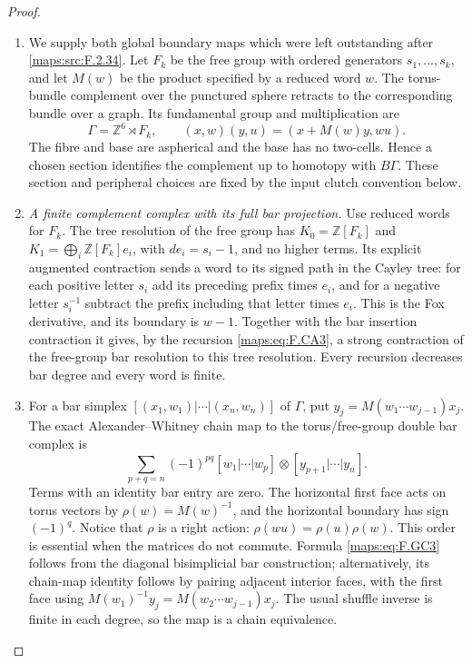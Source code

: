 \begin{proof}
\begin{enumerate}[label=\arabic*.]
\item We supply both global boundary maps which were left outstanding
after \ref{maps:src:F.2.34}.  Let $F_k$ be the free group with ordered
generators $s_1,\ldots,s_k$, and let $M(w)$ be the product
specified by a reduced word $w$.  The torus-bundle complement
over the punctured sphere retracts to the corresponding bundle
over a graph.  Its fundamental group and multiplication are
\[
 \Gamma=\mathbb Z^6\rtimes F_k,
 \qquad (x,w)(y,u)=(x+M(w)y,wu).                            \tag{F.GC2}\label{maps:eq:F.GC2}
\]
The fibre and base are aspherical and the base has no
two-cells.  Hence a chosen section identifies the complement
up to homotopy with $B\Gamma$.  These section and peripheral
choices are fixed by the input clutch convention below.

\item \emph{A finite complement complex with its full bar projection.}
Use reduced words for $F_k$.  The tree resolution of the free
group has $K_0=\mathbb Z[F_k]$ and
$K_1=\bigoplus_i\mathbb Z[F_k]e_i$, with
$de_i=s_i-1$, and no higher terms.  Its explicit augmented
contraction sends a word to its signed path in the Cayley
tree: for each positive letter $s_i$ add its preceding prefix
times $e_i$, and for a negative letter $s_i^{-1}$ subtract
the prefix including that letter times $e_i$.
This is the Fox derivative, and its boundary is $w-1$.
Together with the bar insertion contraction it gives, by
the recursion \eqref{maps:eq:F.CA3}, a strong contraction of the free-group
bar resolution to this tree resolution.  Every recursion
decreases bar degree and every word is finite.

\item For a bar simplex $[(x_1,w_1)|\cdots|(x_n,w_n)]$ of $\Gamma$,
put $y_j=M(w_1\cdots w_{j-1})x_j$.
The exact Alexander--Whitney chain map to the torus/free-group
double bar complex is
\[
 \sum_{p+q=n}(-1)^{pq}
 [w_1|\cdots|w_p]\otimes[y_{p+1}|\cdots|y_n].              \tag{F.GC3}\label{maps:eq:F.GC3}
\]
Terms with an identity bar entry are zero.  The horizontal
first face acts on torus vectors by
$\rho(w)=M(w)^{-1}$, and the horizontal boundary has sign
$(-1)^q$.  Notice that $\rho$ is a right action:
$\rho(wu)=\rho(u)\rho(w)$.  This order is essential when
the matrices do not commute.  Formula \eqref{maps:eq:F.GC3} follows from
the diagonal bisimplicial bar construction; alternatively,
its chain-map identity follows by pairing adjacent interior
faces, with the first face using
$M(w_1)^{-1}y_j=M(w_2\cdots w_{j-1})x_j$.
The usual shuffle inverse is finite in each degree, so the
map is a chain equivalence.


\end{enumerate}
\end{proof}
